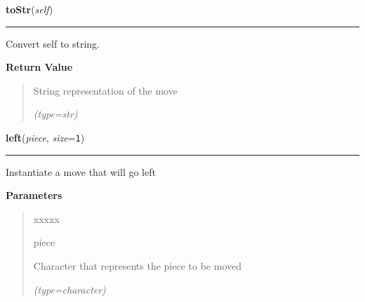     \label{UnBlockMe:Map:Move:Move:toStr}

    \vspace{0.5ex}

\hspace{.8\funcindent}\begin{boxedminipage}{\funcwidth}

    \raggedright \textbf{toStr}(\textit{self})

    \vspace{-1.5ex}

    \rule{\textwidth}{0.5\fboxrule}
\setlength{\parskip}{2ex}
    Convert self to string.

\setlength{\parskip}{1ex}
      \textbf{Return Value}
    \vspace{-1ex}

      \begin{quote}
      String representation of the move

      {\it (type=str)}

      \end{quote}

    \end{boxedminipage}

    \label{UnBlockMe:Map:Move:Move:left}

    \vspace{0.5ex}

\hspace{.8\funcindent}\begin{boxedminipage}{\funcwidth}

    \raggedright \textbf{left}(\textit{piece}, \textit{size}={\tt 1})

    \vspace{-1.5ex}

    \rule{\textwidth}{0.5\fboxrule}
\setlength{\parskip}{2ex}
    Instantiate a move that will go left

\setlength{\parskip}{1ex}
      \textbf{Parameters}
      \vspace{-1ex}

      \begin{quote}
        \begin{Ventry}{xxxxx}

          \item[piece]

          Character that represents the piece to be moved

            {\it (type=character)}

        \end{Ventry}

      \end{quote}

    \end{boxedminipage}

